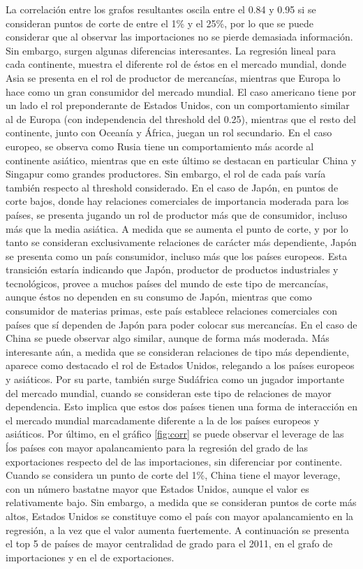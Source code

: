 \documentclass[runningheads,a4paper]{llncs}
\begin{document}
La correlación entre los grafos resultantes oscila entre el 0.84 y 0.95 si se consideran puntos de corte de entre el 1\% y el 25\%, por lo que se puede considerar que al observar las importaciones no se pierde demasiada información. 
Sin embargo, surgen algunas diferencias interesantes. La regresión lineal para cada continente, muestra el diferente rol de éstos en el mercado mundial, donde Asia se presenta en el rol de productor de mercancías, mientras que Europa lo hace como un gran consumidor del mercado mundial. El caso americano tiene por un lado el rol preponderante de Estados Unidos, con un comportamiento similar al de Europa (con independencia del threshold del 0.25), mientras que el resto del continente, junto con Oceanía y África, juegan un rol secundario. En el caso europeo, se observa como Rusia tiene un comportamiento más acorde al continente asiático, mientras que en este último se destacan en particular China y Singapur como grandes productores. 
Sin embargo, el rol de cada país varía también respecto al threshold considerado. En el caso de Japón, en puntos de corte bajos, donde hay relaciones comerciales de importancia moderada para los países, se presenta jugando un rol de productor más que de consumidor, incluso más que la media asiática. A medida que se aumenta el punto de corte, y por lo tanto se consideran exclusivamente relaciones de carácter más dependiente, Japón se presenta como un país consumidor, incluso más que los países europeos. Esta transición estaría indicando que Japón, productor de productos industriales y tecnológicos, provee a muchos países del mundo de este tipo de mercancías, aunque éstos no dependen en su consumo de Japón, mientras que como consumidor de materias primas, este país establece relaciones comerciales con países que sí dependen de Japón para poder colocar sus mercancías. En el caso de China se puede observar algo similar, aunque de forma más moderada. Más interesante aún, a medida que se consideran relaciones de tipo más dependiente, aparece como destacado el rol de Estados Unidos, relegando a los países europeos y asiáticos. Por su parte, también surge Sudáfrica como un jugador importante del mercado mundial, cuando se consideran este tipo de relaciones de mayor dependencia. Esto implica que estos dos países tienen una forma de interacción en el mercado mundial marcadamente diferente a la de los países europeos y asiáticos.
Por último, en el gráfico \ref{fig:corr} se puede observar el leverage de las ĺos países con mayor apalancamiento para la regresión del grado de las exportaciones respecto del de las importaciones, sin diferenciar por continente. Cuando se considera un punto de corte del 1\%, China tiene el mayor leverage, con un número bastatne mayor que Estados Unidos, aunque el valor es relativamente bajo. Sin embargo, a medida que se consideran puntos de corte más altos, Estados Unidos se constituye como el país con mayor apalancamiento en la regresión, a la vez que el valor aumenta fuertemente. 
A continuación se presenta el top 5 de países de mayor centralidad de grado para el 2011, en el grafo de importaciones y en el de exportaciones.
\end{document}
